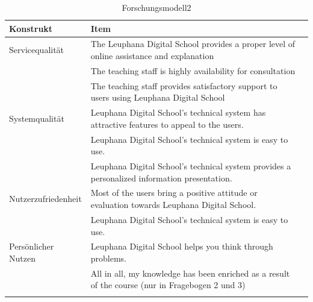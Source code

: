 \begin{table}[ht] 
\caption{Forschungsmodell2}
\label{tab:Forschungsmodell} 
\begin{tabular}{@{}lp{12cm}r@{}} \toprule

\textbf{Konstrukt} & \textbf{Item} \\ \midrule

Servicequalität & The Leuphana Digital School provides a proper level of online assistance and explanation \\ \addlinespace
& The teaching staff is highly availability for consultation\\\addlinespace
& \parbox[t]{12cm}{The teaching staff provides satisfactory support to users using Leuphana Digital School} \\ \addlinespace
Systemqualität & \parbox[t]{12cm}{Leuphana Digital School’s technical system has attractive features to appeal to the users.}\\ \addlinespace
& Leuphana Digital School’s technical system is easy to use. \\\addlinespace
& \parbox[t]{12cm}{Leuphana Digital School’s technical system provides a personalized information presentation.} \\ \addlinespace
Nutzerzufriedenheit & \parbox[t]{12cm}{Most of the users bring a positive attitude or evaluation towards Leuphana Digital School.} \\ \addlinespace
& Leuphana Digital School’s technical system is easy to use.  \\ \addlinespace 
Persönlicher Nutzen & \parbox[t]{12cm}{Leuphana Digital School helps you think through problems.} \\ \addlinespace 
& \parbox[t]{12cm}{All in all, my knowledge has been enriched as a result of the course (nur in Fragebogen 2 und 3)} \\ \addlinespace 
  \bottomrule

\end{tabular}	
\end{table}


